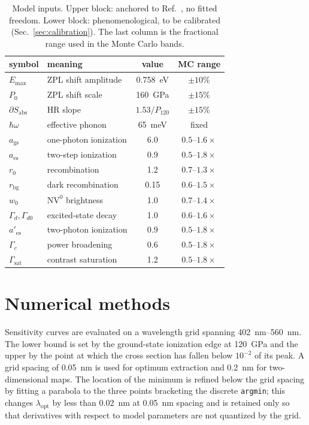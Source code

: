 \documentclass[preprint,12pt]{elsarticle}
\newcommand{\NVz}{\ensuremath{\mathrm{NV}^{0}}}
\newcommand{\lopt}{\ensuremath{\lambda_{\mathrm{opt}}}}
\begin{document}
\begin{table}[t]
  \centering
  \caption{Model inputs. Upper block: anchored to Ref.~\cite{Ho2026}, no fitted
  freedom. Lower block: phenomenological, to be calibrated
  (Sec.~\ref{sec:calibration}). The last column is the fractional range used in
  the Monte Carlo bands.}
  \label{tab:knobs}
  \begin{tabular}{llcc}
    \toprule
    symbol & meaning & value & MC range \\
    \midrule
    $E_{\max}$ & ZPL shift amplitude & \SI{0.758}{\electronvolt} & $\pm 10\%$ \\
    $P_0$ & ZPL shift scale & \SI{160}{\giga\pascal} & $\pm 15\%$ \\
    $\partial S_{\mathrm{abs}}$ & HR slope & $1.53/P_{120}$ & $\pm 15\%$ \\
    $\hbar\omega$ & effective phonon & \SI{65}{\milli\electronvolt} & fixed \\
    \midrule
    $a_{\mathrm{gs}}$ & one-photon ionization & 6.0 & $0.5$--$1.6\times$ \\
    $a_{\mathrm{es}}$ & two-step ionization & 0.9 & $0.5$--$1.8\times$ \\
    $r_0$ & recombination & 1.2 & $0.7$--$1.3\times$ \\
    $r_{\mathrm{bg}}$ & dark recombination & 0.15 & $0.6$--$1.5\times$ \\
    $w_0$ & \NVz{} brightness & 1.0 & $0.7$--$1.4\times$ \\
    \midrule
    $\Gamma_d,\Gamma_{d0}$ & excited-state decay & 1.0 & $0.6$--$1.6\times$ \\
    $a'_{\mathrm{es}}$ & two-photon ionization & 0.9 & $0.5$--$1.8\times$ \\
    $\Gamma_c$ & power broadening & 0.6 & $0.5$--$1.8\times$ \\
    $\Gamma_{\mathrm{sat}}$ & contrast saturation & 1.2 & $0.5$--$1.8\times$ \\
    \bottomrule
  \end{tabular}
\end{table}

\section{Numerical methods}
\label{sec:numerics}

Sensitivity curves are evaluated on a wavelength grid spanning
\SIrange{402}{560}{\nano\meter}. The lower bound is set by the ground-state
ionization edge at \SI{120}{\giga\pascal} and the upper by the point at which the
cross section has fallen below $10^{-2}$ of its peak. A grid spacing of
\SI{0.05}{\nano\meter} is used for optimum extraction and \SI{0.2}{\nano\meter}
for two-dimensional maps. The location of the minimum is refined below the grid
spacing by fitting a parabola to the three points bracketing the discrete
\texttt{argmin}; this changes $\lopt$ by less than \SI{0.02}{\nano\meter} at
\SI{0.05}{\nano\meter} spacing and is retained only so that derivatives with
respect to model parameters are not quantized by the grid.
\end{document}
